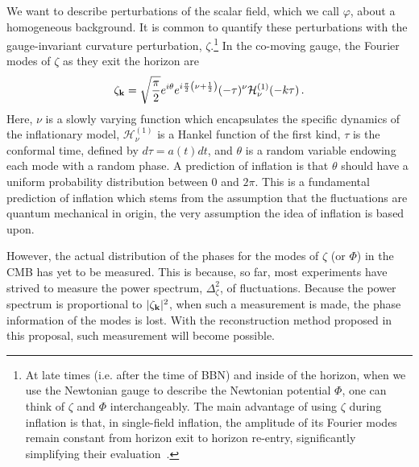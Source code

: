 \documentclass[psfig,11pt]{article}
\def\be{\begin{equation}}
\def\ee{\end{equation}}
\begin{document}
We want to describe perturbations of the scalar field, which we call $\varphi$, about a homogeneous background. It is common to quantify these perturbations with the gauge-invariant curvature perturbation, $\zeta$.\footnote{At late times (i.e. after the time of BBN) and inside of the horizon, when we use the Newtonian gauge to describe the Newtonian potential $\Phi$, one can think of $\zeta$ and $\Phi$ interchangeably. The main advantage of using $\zeta$ during inflation is that, in single-field inflation, the amplitude of its Fourier modes remain constant from horizon exit to horizon re-entry, significantly simplifying their evaluation~\cite{Weinberg2008}.}
 In the co-moving gauge, the Fourier modes of $\zeta$ as they exit the horizon are
\be
	\zeta_{{\bf k}}=\sqrt{\frac{\pi}{2}}e^{i\theta}e^{i\frac{\pi}{2}\left(\nu+\frac{1}{2}\right)}(-\tau)^{\nu}\mathcal{H}^{(1)}_\nu(-k\tau)\, .
\ee
Here, $\nu$ is a slowly varying function which encapsulates the specific dynamics of the inflationary model, $\mathcal{H}^{(1)}_\nu$ is a Hankel function of the first kind, $\tau$ is the conformal time, defined by $d\tau=a(t)dt$, and $\theta$ is a random variable endowing each mode with a random phase. A prediction of inflation is that $\theta$ should have a uniform probability distribution between 0 and $2\pi$. This is a fundamental prediction of inflation which stems from the assumption that the fluctuations are quantum mechanical in origin, the very assumption the idea of inflation is based upon. 

However, the actual distribution of the phases for the modes of $\zeta$ (or $\Phi$) in the CMB has yet to be measured. This is because, so far, most experiments have strived to measure the power spectrum, $\Delta_\zeta^2$, of fluctuations. %
Because the power spectrum is proportional to $ |\zeta_{{\bf k}}|^2$, when such a measurement is made, the phase information of the modes is lost. With the reconstruction method proposed in this proposal, such measurement will become possible.
\end{document}
